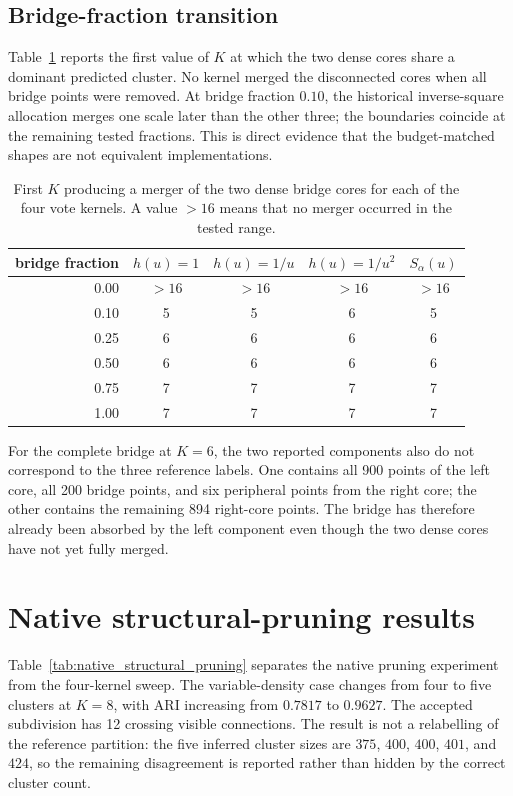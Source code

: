 \documentclass[pdflatex,sn-mathphys-num]{sn-jnl}
\begin{document}
\subsection{Bridge-fraction transition}

Table~\ref{tab:bridge_transition} reports the first value of $K$ at which the two dense cores share a dominant predicted cluster. No kernel merged the disconnected cores when all bridge points were removed. At bridge fraction $0.10$, the historical inverse-square allocation merges one scale later than the other three; the boundaries coincide at the remaining tested fractions. This is direct evidence that the budget-matched shapes are not equivalent implementations.

\begin{table}[t]
\caption{First $K$ producing a merger of the two dense bridge cores for each of
the four vote kernels. A value $>16$ means that no merger occurred in the
tested range.}\label{tab:bridge_transition}
\centering
\begin{tabular}{rcccc}
\toprule
bridge fraction & $h(u)=1$ & $h(u)=1/u$ & $h(u)=1/u^2$ & $S_\alpha(u)$\\
\midrule
0.00 & $>16$ & $>16$ & $>16$ & $>16$\\
0.10 & 5 & 5 & 6 & 5\\
0.25 & 6 & 6 & 6 & 6\\
0.50 & 6 & 6 & 6 & 6\\
0.75 & 7 & 7 & 7 & 7\\
1.00 & 7 & 7 & 7 & 7\\
\bottomrule
\end{tabular}
\end{table}

For the complete bridge at $K=6$, the two reported components also do not
correspond to the three reference labels.  One contains all 900 points of the
left core, all 200 bridge points, and six peripheral points from the right
core; the other contains the remaining 894 right-core points.  The bridge has
therefore already been absorbed by the left component even though the two dense
cores have not yet fully merged.

\section{Native structural-pruning results}
\label{sec:structural_pruning_results}

Table~\ref{tab:native_structural_pruning} separates the native pruning
experiment from the four-kernel sweep.  The variable-density case changes from
four to five clusters at $K=8$, with ARI increasing from $0.7817$ to $0.9627$.
The accepted subdivision has 12 crossing visible connections.  The result is not
a relabelling of the reference partition: the five inferred cluster sizes are
$375$, $400$, $400$, $401$, and $424$, so the remaining disagreement is
reported rather than hidden by the correct cluster count.
\end{document}

